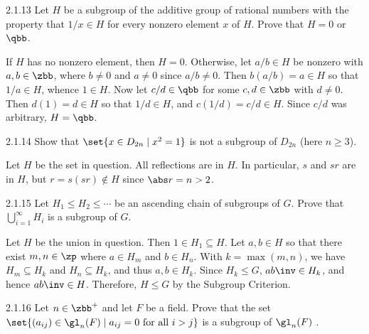 \begin{exercise}{2.1.13}
    Let $H$ be a subgroup of the additive group of rational numbers with the property that $1/x \in H$ for every nonzero element $x$ of $H$.
	Prove that $H = 0$ or $\qbb$.
\end{exercise}

\begin{sol}
    If $H$ has no nonzero element, then $H = 0$.
    Otherwise, let $a/b \in H$ be nonzero with $a, b \in \zbb$, where $b \neq 0$ and $a \neq 0$ since $a/b \neq 0$.
    Then $b(a/b) = a \in H$ so that $1/a \in H$, whence $1 \in H$.
	Now let $c/d \in \qbb$ for some $c, d \in \zbb$ with $d \neq 0$.
	Then $d(1) = d \in H$ so that $1/d \in H$, and $c(1/d) = c/d \in H$.
	Since $c/d$ was arbitrary, $H = \qbb$.
\end{sol}

\begin{exercise}{2.1.14}
    Show that $\set{ x \in D_{2n} \mid x^2 = 1 }$ is not a subgroup of $D_{2n}$ (here $n \geq 3$).
\end{exercise}

\begin{sol}
    Let $H$ be the set in question.
	All reflections are in $H$.
	In particular, $s$ and $sr$ are in $H$, but $r = s(sr) \notin H$ since $\abs r = n > 2$.
\end{sol}

\begin{exercise}{2.1.15}
    Let $H_1 \leq H_2 \leq \cdots$ be an ascending chain of subgroups of $G$.
	Prove that $\bigcup_{i = 1}^\infty H_i$ is a subgroup of $G$.
\end{exercise}

\begin{sol}
    Let $H$ be the union in question.
	Then $1 \in H_1 \subseteq H$.
	Let $a, b \in H$ so that there exist $m, n \in \zp$ where $a \in H_m$ and $b \in H_n$.
    With $k = \max(m, n)$, we have $H_m \subseteq H_k$ and $H_n \subseteq H_k$, and thus $a, b \in H_k$.
    Since $H_k \leq G$, $ab\inv \in H_k$, and hence $ab\inv \in H$.
	Therefore, $H \leq G$ by the Subgroup Criterion.
\end{sol}

\begin{exercise}{2.1.16}
    Let $n \in \zbb^+$ and let $F$ be a field.
	Prove that the set $\set{(a_{ij}) \in \gl_n(F) \mid a_{ij} = 0 \text{ for all } i > j}$ is a subgroup of $\gl_n(F)$ .
\end{exercise}

